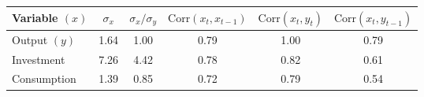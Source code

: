 \begin{tabular}{lccccc}
\toprule
Variable $(x)$ & $\sigma_x$ & $\sigma_x/\sigma_y$ & $\mathrm{Corr}(x_t,x_{t-1})$ & $\mathrm{Corr}(x_t,y_t)$ & $\mathrm{Corr}(x_t,y_{t-1})$ \\
\midrule
Output $(y)$ & 1.64 & 1.00 & 0.79 & 1.00 & 0.79 \\[4pt]
Investment & 7.26 & 4.42 & 0.78 & 0.82 & 0.61 \\[4pt]
Consumption & 1.39 & 0.85 & 0.72 & 0.79 & 0.54 \\[4pt]
\bottomrule
\end{tabular}
